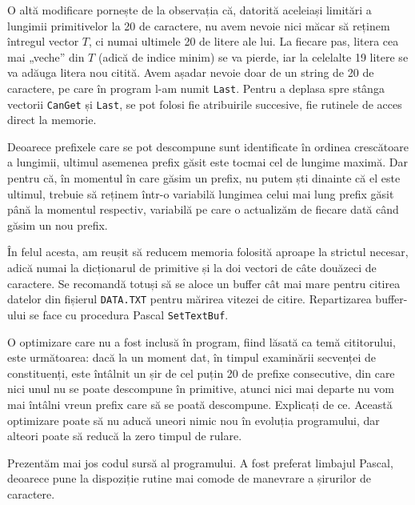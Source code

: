 O altă modificare pornește de la observația că, datorită aceleiași limitări a
lungimii primitivelor la 20 de caractere, nu avem nevoie nici măcar să reținem
întregul vector $T$, ci numai ultimele 20 de litere ale lui. La fiecare pas,
litera cea mai „veche” din $T$ (adică de indice minim) se va pierde, iar la
celelalte 19 litere se va adăuga litera nou citită. Avem așadar nevoie doar de
un string de 20 de caractere, pe care în program l-am numit {\tt Last}. Pentru
a deplasa spre stânga vectorii {\tt CanGet} și {\tt Last}, se pot folosi fie
atribuirile succesive, fie rutinele de acces direct la memorie.

Deoarece prefixele care se pot descompune sunt identificate în ordinea
crescătoare a lungimii, ultimul asemenea prefix găsit este tocmai cel de
lungime maximă. Dar pentru că, în momentul în care găsim un prefix, nu putem
ști dinainte că el este ultimul, trebuie să reținem într-o variabilă lungimea
celui mai lung prefix găsit până la momentul respectiv, variabilă pe care o
actualizăm de fiecare dată când găsim un nou prefix.

În felul acesta, am reușit să reducem memoria folosită aproape la strictul
necesar, adică numai la dicționarul de primitive și la doi vectori de câte
douăzeci de caractere. Se recomandă totuși să se aloce un buffer cât mai mare
pentru citirea datelor din fișierul {\tt DATA.TXT} pentru mărirea vitezei de
citire. Repartizarea buffer-ului se face cu procedura Pascal {\tt SetTextBuf}.

O optimizare care nu a fost inclusă în program, fiind lăsată ca temă
cititorului, este următoarea: dacă la un moment dat, în timpul examinării
secvenței de constituenți, este întâlnit un șir de cel puțin 20 de prefixe
consecutive, din care nici unul nu se poate descompune în primitive, atunci
nici mai departe nu vom mai întâlni vreun prefix care să se poată
descompune. Explicați de ce. Această optimizare poate să nu aducă uneori nimic
nou în evoluția programului, dar alteori poate să reducă la zero timpul de
rulare.

Prezentăm mai jos codul sursă al programului. A fost preferat limbajul Pascal,
deoarece pune la dispoziție rutine mai comode de manevrare a șirurilor de
caractere.

\inputminted{pascal}{src/problem11.pas}
